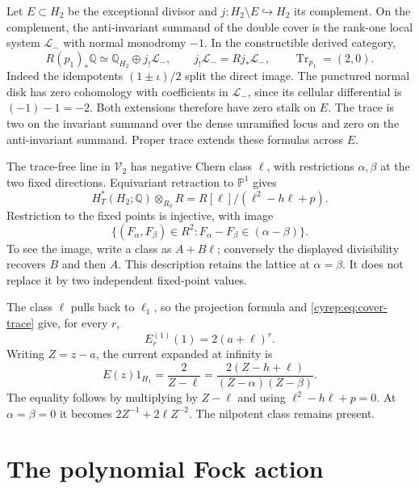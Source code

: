 Let \(E\subset H_2\) be the exceptional divisor and
\(j:H_2\setminus E\hookrightarrow H_2\) its complement.
On the complement, the anti-invariant summand of the double cover
is the rank-one local system \(\mathscr L_-\) with normal monodromy
\(-1\). In the constructible derived category,
\begin{equation}\label{cyrep:eq:cover-trace}
 R(p_1)_*\mathbb Q\simeq\mathbb Q_{H_2}\oplus j_!\mathscr L_-,
 \qquad j_!\mathscr L_-=Rj_*\mathscr L_-,
 \qquad \operatorname{Tr}_{p_1}=(2,0).
\end{equation}
Indeed the idempotents \((1\pm\iota)/2\) split the direct image.
The punctured normal disk has zero cohomology with coefficients
in \(\mathscr L_-\), since its cellular differential is
\((-1)-1=-2\). Both extensions therefore have zero stalk on \(E\).
The trace is two on the invariant summand over the dense unramified
locus and zero on the anti-invariant summand. Proper trace extends
these formulas across \(E\).

The trace-free line in \(\mathcal V_2\) has negative Chern class
\(\ell\), with restrictions \(\alpha,\beta\) at the two fixed
directions. Equivariant retraction to \(\mathbb P^1\) gives
\begin{equation}\label{cyrep:eq:two-ring}
 H_T^*(H_2;\mathbb Q)\otimes_{R_0}R
   =R[\ell]/(\ell^2-h\ell+p).
\end{equation}
Restriction to the fixed points is injective, with image
\[
 \{(F_\alpha,F_\beta)\in R^2:
                   F_\alpha-F_\beta\in(\alpha-\beta)\}.
\]
To see the image, write a class as \(A+B\ell\); conversely the
displayed divisibility recovers \(B\) and then \(A\).
This description retains the lattice at \(\alpha=\beta\).
It does not replace it by two independent fixed-point values.

The class \(\ell\) pulls back to \(\ell_1\), so the projection
formula and \eqref{cyrep:eq:cover-trace} give, for every \(r\),
\[
 E_r^{(1)}(1)=2(a+\ell)^r.
\]
Writing \(Z=z-a\), the current expanded at infinity is
\begin{equation}\label{cyrep:eq:geometric-current}
 E(z)1_{H_1}=\frac{2}{Z-\ell}
       =\frac{2(Z-h+\ell)}{(Z-\alpha)(Z-\beta)}.
\end{equation}
The equality follows by multiplying by \(Z-\ell\) and using
\(\ell^2-h\ell+p=0\). At \(\alpha=\beta=0\) it becomes
\(2Z^{-1}+2\ell Z^{-2}\). The nilpotent class remains present.

\section{The polynomial Fock action}
\label{cyrep:sec:polynomial}


